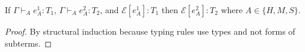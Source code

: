 \begin{lemma}
\label{ecp}
\onehalfspacing
If $\Gamma\vdash_{A}e_{A}^{1}:T_{1}$, $\Gamma\vdash_{A}e_{A}^{2}:T_{2}$, and $\mathscr{E}[e_{A}^{1}]:T_{1}$ then $\mathscr{E}[e_{A}^{2}]:T_{2}$ where $A\in\lbrace H,M,S\rbrace$.
\begin{proof}
By structural induction because typing rules use types and not forms of subterms.
\end{proof}
\end{lemma}